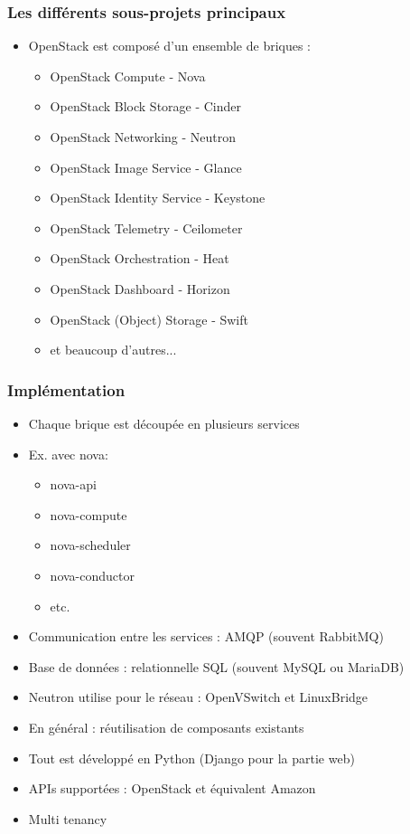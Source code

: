   \begin{frame}
    \frametitle{Les différents sous-projets principaux}
    \begin{itemize}
      \item OpenStack est composé d'un ensemble de briques :
      \begin{itemize}
        \item OpenStack Compute - Nova
        \item OpenStack Block Storage - Cinder
        \item OpenStack Networking - Neutron
        \item OpenStack Image Service - Glance
        \item OpenStack Identity Service - Keystone
        \item OpenStack Telemetry - Ceilometer
        \item OpenStack Orchestration - Heat
        \item OpenStack Dashboard - Horizon
        \item OpenStack (Object) Storage - Swift
        \item et beaucoup d'autres...
      \end{itemize}
    \end{itemize}
  \end{frame}

  \begin{frame}
    \frametitle{Implémentation}
    \begin{itemize}
      \item Chaque brique est découpée en plusieurs services
      \item Ex. avec nova:
        \begin{itemize}
          \item nova-api
          \item nova-compute
          \item nova-scheduler
          \item nova-conductor
          \item etc.
        \end{itemize}
      \item Communication entre les services : AMQP (souvent RabbitMQ)
      \item Base de données : relationnelle SQL (souvent MySQL ou MariaDB)
      \item Neutron utilise pour le réseau : OpenVSwitch et LinuxBridge
      \item En général : réutilisation de composants existants
      \item Tout est développé en Python (Django pour la partie web)
      \item APIs supportées : OpenStack et équivalent Amazon
      \item Multi tenancy
    \end{itemize}
  \end{frame}


